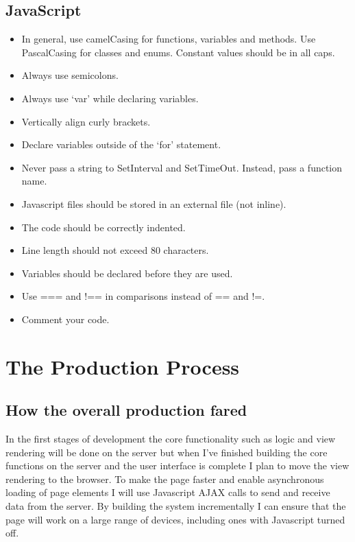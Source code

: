 \documentclass[paper=a4, fontsize=11pt]{scrartcl} %
\numberwithin{equation}{section} %
\numberwithin{figure}{section} %
\numberwithin{table}{section} %
\begin{document}
  \subsection{JavaScript}
  \begin{itemize}
    \item In general, use camelCasing for functions, variables and methods. Use PascalCasing for classes and enums. Constant values should be in all caps.
    \item Always use semicolons.
    \item Always use ‘var’ while declaring variables.
    \item Vertically align curly brackets.
    \item Declare variables outside of the ‘for’ statement.
    \item Never pass a string to SetInterval and SetTimeOut. Instead, pass a function name.
    \item Javascript files should be stored in an external file (not inline).
    \item The code should be correctly indented.
    \item Line length should not exceed 80 characters.
    \item Variables should be declared before they are used.
    \item Use === and !== in comparisons instead of == and !=.
    \item Comment your code.
    \end{itemize}
  

\section{The Production Process}
\subsection{How the overall production fared}
In the first stages of development the core functionality such as logic and view rendering will be done on the server but when I've finished building the core functions on the server and the user interface is complete I plan to  move the view rendering to the browser. To make the page faster and enable asynchronous loading of page elements I will use Javascript AJAX calls to send and receive data from  the server. By building the system incrementally I can ensure that the page will work on a large range of devices, including ones with Javascript turned off.
\end{document}
